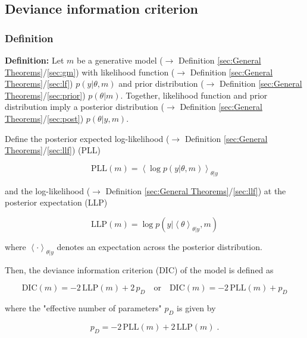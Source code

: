 \documentclass[a4paper,12pt,twoside]{book}
\begin{document}
\subsection{Deviance information criterion}

\subsubsection[\textit{Definition}]{Definition} \label{sec:dic}
\setcounter{equation}{0}

\textbf{Definition:} Let $m$ be a generative model ($\rightarrow$ Definition \ref{sec:General Theorems}/\ref{sec:gm}) with likelihood function ($\rightarrow$ Definition \ref{sec:General Theorems}/\ref{sec:lf}) $p(y \vert \theta, m)$ and prior distribution ($\rightarrow$ Definition \ref{sec:General Theorems}/\ref{sec:prior}) $p(\theta \vert m)$. Together, likelihood function and prior distribution imply a posterior distribution ($\rightarrow$ Definition \ref{sec:General Theorems}/\ref{sec:post}) $p(\theta \vert y, m)$.

Define the posterior expected log-likelihood ($\rightarrow$ Definition \ref{sec:General Theorems}/\ref{sec:llf}) (PLL)

\begin{equation} \label{eq:dic-PLL}
\mathrm{PLL}(m) = \left\langle \log p(y|\theta,m) \right\rangle_{\theta|y}
\end{equation}

and the log-likelihood ($\rightarrow$ Definition \ref{sec:General Theorems}/\ref{sec:llf}) at the posterior expectation (LLP)

\begin{equation} \label{eq:dic-LLP}
\mathrm{LLP}(m) = \log p(y|\left\langle \theta \right\rangle_{\theta|y},m)
\end{equation}

where $\left\langle \cdot \right\rangle_{\theta \vert y}$ denotes an expectation across the posterior distribution.

Then, the deviance information criterion (DIC) of the model is defined as

\begin{equation} \label{eq:dic-DIC}
\mathrm{DIC}(m) = -2 \, \mathrm{LLP}(m) + 2 \, p_D \quad \text{or} \quad \mathrm{DIC}(m) = -2 \, \mathrm{PLL}(m) + p_D
\end{equation}

where the "effective number of parameters" $p_D$ is given by

\begin{equation} \label{eq:dic-DIC-pD}
p_D = -2 \, \mathrm{PLL}(m) +2 \, \mathrm{LLP}(m) \; .
\end{equation}
\end{document}
